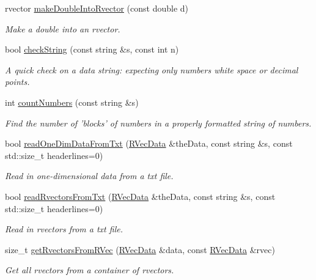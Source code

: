 \begin{DoxyCompactItemize}
rvector \hyperlink{namespacesubpavings_a6f8c4a15a4428e18b5ef0369782c86ae}{make\-Double\-Into\-Rvector} (const double d)
\begin{DoxyCompactList}\small\item\em \-Make a double into an rvector. \end{DoxyCompactList}\item 
bool \hyperlink{namespacesubpavings_af62c725dd362922c15d45983e2d8f6cf}{check\-String} (const string \&s, const int n)
\begin{DoxyCompactList}\small\item\em \-A quick check on a data string\-: expecting only numbers white space or decimal points. \end{DoxyCompactList}\item 
int \hyperlink{namespacesubpavings_a4160d2d9f357dddf86d43f70c9bb8063}{count\-Numbers} (const string \&s)
\begin{DoxyCompactList}\small\item\em \-Find the number of 'blocks' of numbers in a properly formatted string of numbers. \end{DoxyCompactList}\item 
bool \hyperlink{namespacesubpavings_a535c4c5b9e6a042ec418db09ed956cda}{read\-One\-Dim\-Data\-From\-Txt} (\hyperlink{namespacesubpavings_a30e15e24c8d81a2160d7422ef3c39d68}{\-R\-Vec\-Data} \&the\-Data, const string \&s, const std\-::size\-\_\-t headerlines=0)
\begin{DoxyCompactList}\small\item\em \-Read in one-\/dimensional data from a txt file. \end{DoxyCompactList}\item 
bool \hyperlink{namespacesubpavings_a7918dddb1a8e32f72835e1e7b4442ca6}{read\-Rvectors\-From\-Txt} (\hyperlink{namespacesubpavings_a30e15e24c8d81a2160d7422ef3c39d68}{\-R\-Vec\-Data} \&the\-Data, const string \&s, const std\-::size\-\_\-t headerlines=0)
\begin{DoxyCompactList}\small\item\em \-Read in rvectors from a txt file. \end{DoxyCompactList}\item 
size\-\_\-t \hyperlink{namespacesubpavings_a211cb10f439ff2bdb92ce92906159792}{get\-Rvectors\-From\-R\-Vec} (\hyperlink{namespacesubpavings_a30e15e24c8d81a2160d7422ef3c39d68}{\-R\-Vec\-Data} \&data, const \hyperlink{namespacesubpavings_a30e15e24c8d81a2160d7422ef3c39d68}{\-R\-Vec\-Data} \&rvec)
\begin{DoxyCompactList}\small\item\em \-Get all rvectors from a container of rvectors. \end{DoxyCompactList}\item 

\end{DoxyCompactItemize}
